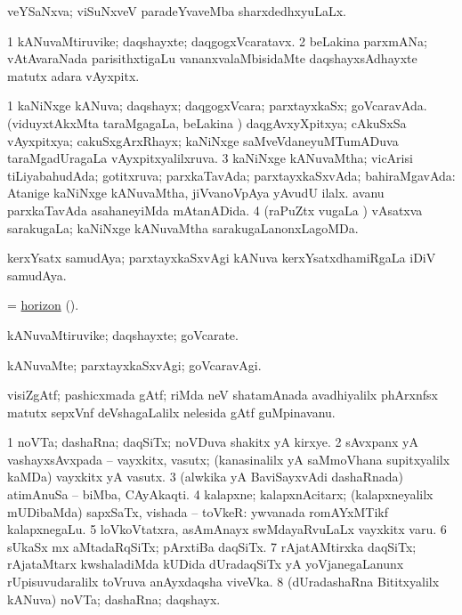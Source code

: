 \bentry 
{} 
\gl{\gu}
\expl{}
\bmng
 veYSaNxva; viSuNxveV paradeYvaveMba sharxdedhxyuLaLx. 
\emng
\eentry

\bentry
{} 
\gl{\nA}
\expl{}
\bmng
\bnum
\num{1} kANuvaMtiruvike; daqshayxte; daqgogxVcaratavx. 
\num{2} beLakina parxmANa; vAtAvaraNada parisithxtigaLu \mo vananxvalaMbisidaMte daqshayxsAdhayxte matutx adara vAyxpitx. 
\enum
\emng
\eentry

\bentry
{} 
\gl{\gu}
\expl{}
\bmng
\bnum
\num{1} kaNiNxge kANuva; daqshayx; daqgogxVcara; parxtayxkaSx; goVcaravAda. (viduyxtAkxMta taraMgagaLa, beLakina \vi) daqgAvxyXpitxya; cAkuSxSa vAyxpitxya; cakuSxgArxRhayx; kaNiNxge saMveVdaneyuMTumADuva taraMgadUragaLa vAyxpitxyalilxruva. 
\num{3} kaNiNxge kANuvaMtha; vicArisi tiLiyabahudAda; gotitxruva; parxkaTavAda; parxtayxkaSxvAda; bahiraMgavAda:  Atanige kaNiNxge kANuvaMtha, jiVvanoVpAya yAvudU ilalx.  avanu parxkaTavAda asahaneyiMda mAtanADida. 
\num{4} (raPuZtx \mo vugaLa \vi) vAsatxva sarakugaLa; kaNiNxge kANuvaMtha sarakugaLanonxLagoMDa. 
\enum
\emng

\noindent 
\gl{\pagu}
\expl{}
\bmng
  kerxYsatx samudAya; parxtayxkaSxvAgi kANuva kerxYsatxdhamiRgaLa iDiV samudAya. 
\emng
\eentry

\bentry
{}
\gl{\nA}
\expl{}
\bmng
 = \hyperref{kandict_h.pdf}{H}{horizon pagu(6)}{horizon} (\pagu {}). 
\emng
\eentry

\bentry
{} 
\gl{\nA}
\expl{}
\bmng
 kANuvaMtiruvike; daqshayxte; goVcarate. 
\emng
\eentry

\bentry 
{} 
\gl{\kirxvi}
\expl{}
\bmng
 kANuvaMte; parxtayxkaSxvAgi; goVcaravAgi. 
\emng
\eentry

\bentry 
{} 
\gl{\nA}
\expl{}
\bmng
 visiZgAtf; pashicxmada gAtf; riMda neV shatamAnada avadhiyalilx phArxnfsx matutx sepxVnf deVshagaLalilx nelesida gAtf guMpinavanu. 
\emng
\eentry

\bentry 
{} 
\gl{\nA}
\expl{}
\bmng
\bnum
\num{1} noVTa; dashaRna; daqSiTx; noVDuva shakitx yA kirxye. 
\num{2} sAvxpanx yA vashayxsAvxpada -- vayxkitx, vasutx; (kanasinalilx yA saMmoVhana supitxyalilx kaMDa) vayxkitx yA vasutx. 
\num{3} (alwkika yA BaviSayxvAdi dashaRnada) atimAnuSa -- biMba, CAyAkaqti. 
\num{4} kalapxne; kalapxnAcitarx; (kalapxneyalilx mUDibaMda) sapxSaTx, vishada -- toVkeR:  ywvanada romAYxMTikf kalapxnegaLu. 
\num{5} loVkoVtatxra, asAmAnayx swMdayaRvuLaLx vayxkitx \mo varu. 
\num{6} sUkaSx mx aMtadaRqSiTx; pArxtiBa daqSiTx. 
\num{7} rAjatAMtirxka daqSiTx; rAjataMtarx kwshaladiMda kUDida dUradaqSiTx yA yoVjanegaLanunx rUpisuvudaralilx toVruva anAyxdaqsha viveVka. 
\num{8} (dUradashaRna Bititxyalilx kANuva) noVTa; dashaRna; daqshayx. 
\enum
\emng

